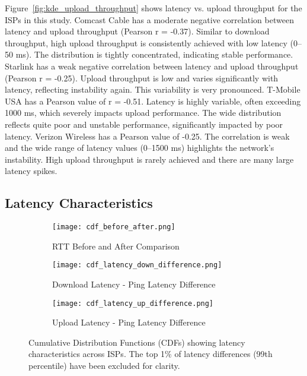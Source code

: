 Figure~\ref{fig:kde_upload_throughput} shows latency vs. upload throughput for the ISPs in this study.
Comcast Cable has a moderate negative correlation between latency and upload throughput (Pearson r = -0.37).
Similar to download throughput, high upload throughput is consistently achieved with low latency (0–50 ms).
The distribution is tightly concentrated, indicating stable performance. Starlink has a weak 
negative correlation between latency and upload throughput (Pearson r = -0.25).
Upload throughput is low and varies significantly with latency, reflecting instability again.
This variability is very pronounced. T-Mobile USA has a Pearson value of r = -0.51. 
Latency is highly variable, often exceeding 1000 ms, which severely impacts upload performance.
The wide distribution reflects quite poor and unstable performance, significantly impacted by 
poor latency. Verizon Wireless has a Pearson value of -0.25. The correlation is weak and 
the wide range of latency values (0–1500 ms) highlights the network's instability. 
High upload throughput is rarely achieved and there are many large latency spikes.


\subsection{Latency Characteristics}

\begin{figure}[H]
    \centering
    \begin{subfigure}{0.48\textwidth}
        \centering
        \texttt{[image: cdf\_before\_after.png]}
        \caption{RTT Before and After Comparison}
        \label{fig:cdf_rtt_before_after}
    \end{subfigure}
    \hfill
    \begin{subfigure}{0.48\textwidth}
        \centering
        \texttt{[image: cdf\_latency\_down\_difference.png]}
        \caption{Download Latency - Ping Latency Difference}
        \label{fig:cdf_download_latency_difference}
    \end{subfigure}
    
    \begin{subfigure}{0.48\textwidth}
        \centering
        \texttt{[image: cdf\_latency\_up\_difference.png]}
        \caption{Upload Latency - Ping Latency Difference}
        \label{fig:cdf_upload_latency_difference}
    \end{subfigure}

    \caption{Cumulative Distribution Functions (CDFs) showing latency characteristics across ISPs. The top 1\% of latency differences (99th percentile) have been excluded for clarity.}
    \label{fig:cdf_latency_characteristics}
\end{figure}


